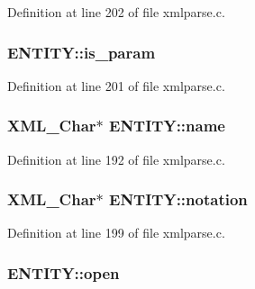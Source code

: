 Definition at line 202 of file xmlparse.\+c.

\subsubsection[{\texorpdfstring{is\+\_\+param}{is_param}}]{ E\+N\+T\+I\+T\+Y\+::is\+\_\+param}\hypertarget{struct_e_n_t_i_t_y_a6caf2a095d9b019c96ef2864ae782936}{}\label{struct_e_n_t_i_t_y_a6caf2a095d9b019c96ef2864ae782936}


Definition at line 201 of file xmlparse.\+c.

\subsubsection[{\texorpdfstring{name}{name}}]{ {\bf X\+M\+L\+\_\+\+Char}$\ast$ E\+N\+T\+I\+T\+Y\+::name}\hypertarget{struct_e_n_t_i_t_y_a98131be27a5e764186275b66151cd6af}{}\label{struct_e_n_t_i_t_y_a98131be27a5e764186275b66151cd6af}


Definition at line 192 of file xmlparse.\+c.

\subsubsection[{\texorpdfstring{notation}{notation}}]{ {\bf X\+M\+L\+\_\+\+Char}$\ast$ E\+N\+T\+I\+T\+Y\+::notation}\hypertarget{struct_e_n_t_i_t_y_af99aeccdfa361acd6c15537875083eaf}{}\label{struct_e_n_t_i_t_y_af99aeccdfa361acd6c15537875083eaf}


Definition at line 199 of file xmlparse.\+c.

\subsubsection[{\texorpdfstring{open}{open}}]{ E\+N\+T\+I\+T\+Y\+::open}\hypertarget{struct_e_n_t_i_t_y_a90ce561ae568fd2edb0f959317b35c61}{}\label{struct_e_n_t_i_t_y_a90ce561ae568fd2edb0f959317b35c61}


